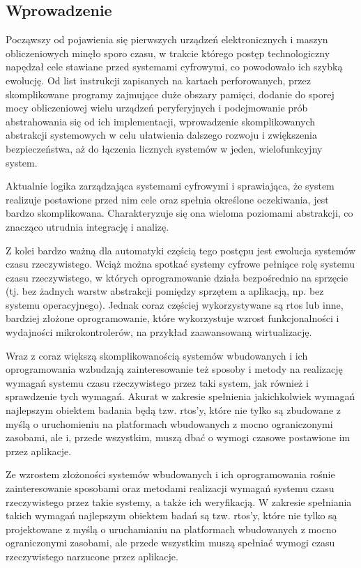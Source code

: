 \documentclass[../../main]{subfiles}
\begin{document}
\subsection{Wprowadzenie}

Począwszy od pojawienia się pierwszych urządzeń elektronicznych i maszyn obliczeniowych minęło sporo czasu, w trakcie którego postęp technologiczny napędzał cele stawiane przed systemami cyfrowymi, co powodowało ich szybką ewolucję. Od list instrukcji zapisanych na kartach perforowanych, przez skomplikowane programy zajmujące duże obszary pamięci, dodanie do sporej mocy obliczeniowej wielu urządzeń peryferyjnych i podejmowanie prób abstrahowania się od ich implementacji, wprowadzenie skomplikowanych abstrakcji systemowych w celu ułatwienia dalszego rozwoju i zwiększenia bezpieczeństwa, aż do łączenia licznych systemów w jeden, wielofunkcyjny system.

Aktualnie logika zarządzająca systemami cyfrowymi i sprawiająca, że system realizuje postawione przed nim cele oraz spełnia określone oczekiwania, jest bardzo skomplikowana. Charakteryzuje się ona wieloma poziomami abstrakcji, co znacząco utrudnia integrację i analizę.

Z kolei bardzo ważną dla automatyki częścią tego postępu jest ewolucja systemów czasu rzeczywistego. Wciąż można spotkać systemy cyfrowe pełniące rolę systemu czasu rzeczywistego, w których oprogramowanie działa bezpośrednio na sprzęcie (tj. bez żadnych warstw abstrakcji pomiędzy sprzętem a aplikacją, np. bez systemu operacyjnego). Jednak coraz częściej wykorzystywane są \gls{rtos} lub inne, bardziej złożone oprogramowanie, które wykorzystuje wzrost funkcjonalności i wydajności mikrokontrolerów, na przykład zaawansowaną wirtualizację.

Wraz z coraz większą skomplikowanością systemów wbudowanych i ich oprogramowania wzbudzają zainteresowanie też sposoby i metody na realizację wymagań systemu czasu rzeczywistego przez taki system, jak również i sprawdzenie tych wymagań. Akurat w zakresie spełnienia jakichkolwiek wymagań najlepszym obiektem badania będą tzw. \gls{rtos}'y, które nie tylko są zbudowane z myślą o uruchomieniu na platformach wbudowanych z mocno ograniczonymi zasobami, ale i, przede wszystkim, muszą dbać o wymogi czasowe postawione im przez aplikacje.

Ze wzrostem złożoności systemów wbudowanych i ich oprogramowania rośnie zainteresowanie sposobami oraz metodami realizacji wymagań systemu czasu rzeczywistego przez takie systemy, a także ich weryfikacją. W zakresie spełniania takich wymagań najlepszym obiektem badań są tzw. \gls{rtos}'y, które nie tylko są projektowane z myślą o uruchamianiu na platformach wbudowanych z mocno ograniczonymi zasobami, ale przede wszystkim muszą spełniać wymogi czasu rzeczywistego narzucone przez aplikacje.
\end{document}
